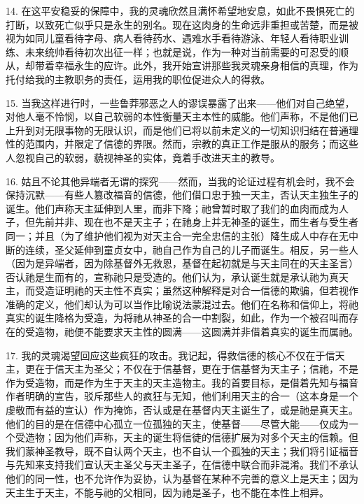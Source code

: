 14. 在这平安稳妥的保障中，我的灵魂欣然且满怀希望地安息，如此不畏惧死亡的打断，以致死亡似乎只是永生的别名。现在这肉身的生命远非重担或苦楚，而是被视为如同儿童看待字母、病人看待药水、遇难水手看待游泳、年轻人看待职业训练、未来统帅看待初次出征一样；也就是说，作为一种对当前需要的可忍受的顺从，却带着幸福永生的应许。此外，我开始宣讲那些我灵魂亲身相信的真理，作为托付给我的主教职务的责任，运用我的职位促进众人的得救。\par

15. 当我这样进行时，一些鲁莽邪恶之人的谬误暴露了出来——他们对自己绝望，对他人毫不怜悯，以自己软弱的本性衡量天主本性的威能。他们声称，不是他们已上升到对无限事物的无限认识，而是他们已将以前未定义的一切知识归结在普通理性的范围内，并限定了信德的界限。然而，宗教的真正工作是服从的服务；而这些人忽视自己的软弱，藐视神圣的实体，竟着手改进天主的教导。\par

16. 姑且不论其他异端者无谓的探究——然而，当我的论证过程有机会时，我不会保持沉默——有些人篡改福音的信德，他们借口忠于独一天主，否认天主独生子的诞生。他们声称天主延伸到人里，而非下降；祂曾暂时取了我们的血肉而成为人子，但先前并非、现在也不是天主子；在祂身上并无神圣的诞生，而生者与受生者同一；并且（为了维护他们视为对天主合一完全忠信的主张）降生成人中存在无中断的连续，圣父延伸到童贞女中，祂自己作为自己的儿子而诞生。相反，另一些人（因为是异端者，因为除基督外无救恩，基督在起初就是与天主同在的天主圣言）否认祂是生而有的，宣称祂只是受造的。他们认为，承认诞生就是承认祂为真天主，而受造证明祂的天主性不真实；虽然这种解释是对合一信德的欺骗，但若视作准确的定义，他们却认为可以当作比喻说法蒙混过去。他们在名称和信仰上，将祂真实的诞生降格为受造，为将祂从神圣的合一中割裂，如此，作为一个被召叫而存在的受造物，祂便不能要求天主性的圆满——这圆满并非借着真实的诞生而属祂。\par

17. 我的灵魂渴望回应这些疯狂的攻击。我记起，得救信德的核心不仅在于信天主，更在于信天主为圣父；不仅在于信基督，更在于信基督为天主子；信祂，不是作为受造物，而是作为生于天主的天主造物主。我的首要目标，是借着先知与福音作者明确的宣告，驳斥那些人的疯狂与无知，他们利用天主的合一（这本身是一个虔敬而有益的宣认）作为掩饰，否认或是在基督内天主诞生了，或是祂是真天主。他们的目的是在信德中心孤立一位孤独的天主，使基督——尽管大能——仅成为一个受造物；因为他们声称，天主的诞生将信徒的信德扩展为对多个天主的信赖。但我们蒙神圣教导，既不自认两个天主，也不自认一个孤独的天主；我们将引证福音与先知来支持我们宣认天主圣父与天主圣子，在信德中联合而非混淆。我们不承认他们的同一性，也不允许作为妥协，认为基督在某种不完善的意义上是天主；因为天主生于天主，不能与祂的父相同，因为祂是圣子，也不能在本性上相异。\par

